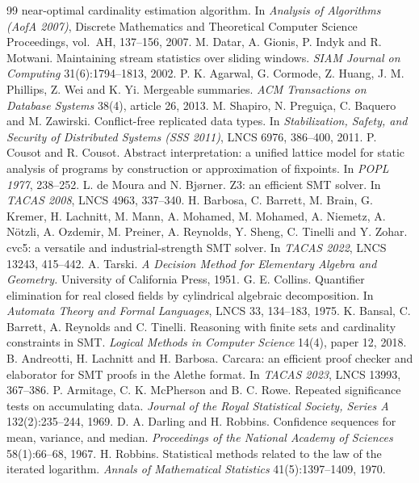 \documentclass[11pt]{article}
\theoremstyle{definition}
\theoremstyle{plain}
\begin{document}
\begin{thebibliography}{99}
near-optimal cardinality estimation algorithm. In \emph{Analysis of Algorithms (AofA 2007)},
Discrete Mathematics and Theoretical Computer Science Proceedings, vol.~AH, 137--156, 2007.
 M. Datar, A. Gionis, P. Indyk and R. Motwani. Maintaining stream statistics over
sliding windows. \emph{SIAM Journal on Computing} 31(6):1794--1813, 2002.
 P. K. Agarwal, G. Cormode, Z. Huang, J. M. Phillips, Z. Wei and K. Yi. Mergeable
summaries. \emph{ACM Transactions on Database Systems} 38(4), article 26, 2013.
 M. Shapiro, N. Pregui\c{c}a, C. Baquero and M. Zawirski. Conflict-free replicated data
types. In \emph{Stabilization, Safety, and Security of Distributed Systems (SSS 2011)}, LNCS 6976,
386--400, 2011.
 P. Cousot and R. Cousot. Abstract interpretation: a unified lattice model for static
analysis of programs by construction or approximation of fixpoints. In \emph{POPL 1977}, 238--252.
 L. de Moura and N. Bj\o rner. Z3: an efficient SMT solver. In \emph{TACAS 2008}, LNCS
4963, 337--340.
 H. Barbosa, C. Barrett, M. Brain, G. Kremer, H. Lachnitt, M. Mann, A. Mohamed,
M. Mohamed, A. Niemetz, A. N\"otzli, A. Ozdemir, M. Preiner, A. Reynolds, Y. Sheng, C. Tinelli and
Y. Zohar. cvc5: a versatile and industrial-strength SMT solver. In \emph{TACAS 2022}, LNCS 13243,
415--442.
 A. Tarski. \emph{A Decision Method for Elementary Algebra and Geometry.} University
of California Press, 1951.
 G. E. Collins. Quantifier elimination for real closed fields by cylindrical
algebraic decomposition. In \emph{Automata Theory and Formal Languages}, LNCS 33, 134--183, 1975.
 K. Bansal, C. Barrett, A. Reynolds and C. Tinelli. Reasoning with finite sets
and cardinality constraints in SMT. \emph{Logical Methods in Computer Science} 14(4), paper 12,
2018.
 B. Andreotti, H. Lachnitt and H. Barbosa. Carcara: an efficient proof checker and
elaborator for SMT proofs in the Alethe format. In \emph{TACAS 2023}, LNCS 13993, 367--386.
 P. Armitage, C. K. McPherson and B. C. Rowe. Repeated significance tests on
accumulating data. \emph{Journal of the Royal Statistical Society, Series A} 132(2):235--244, 1969.
 D. A. Darling and H. Robbins. Confidence sequences for mean, variance, and median.
\emph{Proceedings of the National Academy of Sciences} 58(1):66--68, 1967.
 H. Robbins. Statistical methods related to the law of the iterated logarithm.
\emph{Annals of Mathematical Statistics} 41(5):1397--1409, 1970.

\end{thebibliography}
\end{document}
